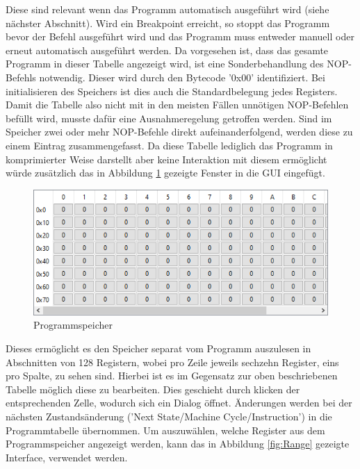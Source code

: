 \documentclass[12pt]{article}
\begin{document}
\noindent
Diese sind relevant wenn das Programm automatisch ausgeführt wird (siehe nächster Abschnitt). Wird ein Breakpoint erreicht, so stoppt das Programm bevor der Befehl ausgeführt wird und das Programm muss entweder manuell oder erneut automatisch ausgeführt werden. Da vorgesehen ist, dass das gesamte Programm in dieser Tabelle angezeigt wird, ist eine Sonderbehandlung des NOP-Befehls notwendig. Dieser wird durch den Bytecode '0x00' identifiziert. Bei initialisieren des Speichers ist dies auch die Standardbelegung jedes Registers. Damit die Tabelle also nicht mit in den meisten Fällen unnötigen NOP-Befehlen befüllt wird, musste dafür eine Ausnahmeregelung getroffen werden. Sind im Speicher zwei oder mehr NOP-Befehle direkt aufeinanderfolgend, werden diese zu einem Eintrag zusammengefasst. Da diese Tabelle lediglich das Programm in komprimierter Weise darstellt aber keine Interaktion mit diesem ermöglicht würde zusätzlich das in Abbildung \ref{fig:ProgSpeicher} gezeigte Fenster in die GUI eingefügt.\vspace{10pt}

\begin{figure}[h]
\centering
\includegraphics[width=12cm]{bilder/ProgramMemory}
\caption{Programmspeicher}
\label{fig:ProgSpeicher}
\end{figure}

\noindent
Dieses ermöglicht es den Speicher separat vom Programm auszulesen in Abschnitten von 128 Registern, wobei pro Zeile jeweils sechzehn Register, eins pro Spalte, zu sehen sind. Hierbei ist es im Gegensatz zur oben beschriebenen Tabelle möglich diese zu bearbeiten. Dies geschieht durch klicken der entsprechenden Zelle, wodurch sich ein Dialog öffnet. Änderungen werden bei der nächsten Zustandsänderung ('Next State/Machine Cycle/Instruction') in die Programmtabelle übernommen. Um auszuwählen, welche Register aus dem Programmspeicher angezeigt werden, kann das in Abbildung \ref{fig:Range} gezeigte Interface, verwendet werden.\vspace{10pt}
\end{document}
